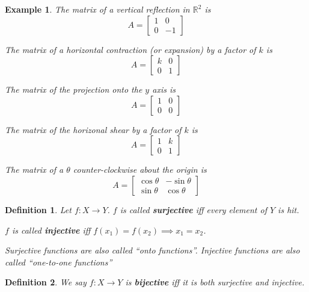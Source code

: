 \documentclass[11pt]{article}
\newtheorem{defn}{Definition}
\newtheorem{ex}{Example}
\begin{document}
\begin{ex}

  The matrix of a  vertical reflection in $\mathbb{R}^{2}$ is
  \[A = \begin{bmatrix} 1 & 0 \\ 0 & -1 \end{bmatrix}\]

  The matrix of a horizontal contraction (or expansion) by a factor of $k$ is
  \[A = \begin{bmatrix} k & 0 \\ 0 & 1 \end{bmatrix}\]


  The matrix of the projection onto the $y$ axis is
  \[A = \begin{bmatrix} 1 & 0 \\ 0 & 0 \end{bmatrix}\]


  The matrix of the horizonal shear by a factor of $k$ is
  \[A = \begin{bmatrix} 1 & k \\ 0 & 1 \end{bmatrix}\]


  The matrix of a $\theta$ counter-clockwise about the origin is
  \[A = \begin{bmatrix} \cos\theta & -\sin\theta \\ \sin\theta & \cos\theta \end{bmatrix} \]
\end{ex}

\begin{defn}
  Let $f : X \to Y$.
  $f$ is called \textbf{surjective} iff every element of $Y$ is hit.

  $f$ is called \textbf{injective} iff $f(x_{1}) = f(x_{2}) \implies x_{1} = x_{2}$.

  Surjective functions are also called ``onto functions''.
  Injective functions are also called ``one-to-one functions''
\end{defn}

\begin{defn}
  We say $f: X \to Y$ is \textbf{bijective} iff it is both surjective and injective.
\end{defn}
\end{document}
